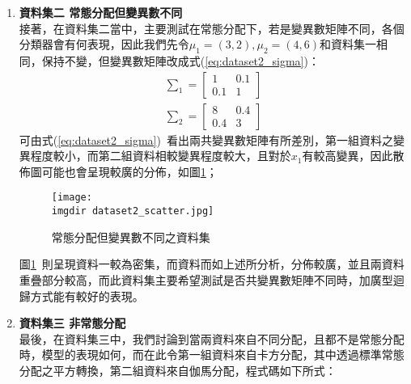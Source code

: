 \begin{enumerate}
	\item{\textbf{資料集二 常態分配但變異數不同}\\
接著，在資料集二當中，主要測試在常態分配下，若是變異數矩陣不同，各個分類器會有何表現，因此我們先令$\mu_1 = (3,2),\mu_2 =(4,6)$和資料集一相同，保持不變，但變異數矩陣改成式(\ref{eq:dataset2_sigma})：
	\begin{equation} 
	\begin{split}\label{eq:dataset2_sigma}
	\sum_{1} = \left[
            \begin{array}{cc}
                1 & 0.1 \\
                0.1 & 1    
            \end{array} \right]\\ 
     \sum_{2} = \left[
            \begin{array}{cc}
                8 & 0.4 \\
                0.4 & 3    
            \end{array} \right] 
    \end{split}  
    \end{equation}
	可由式(\ref{eq:dataset2_sigma})\ 看出兩共變異數矩陣有所差別，第一組資料之變異程度較小，而第二組資料相較變異程度較大，且對於$x_1$有較高變異，因此散佈圖可能也會呈現較廣的分佈，如圖\ref{fig:dataset2_scatter}；
\begin{figure}[H]	
		\centering	 			 	 
   		\texttt{[image: \\imgdir dataset2\_scatter.jpg]} 
   		\caption{常態分配但變異數不同之資料集}
   		\label{fig:dataset2_scatter}   			 		 
	\end{figure}	
	圖\ref{fig:dataset2_scatter}\ 則呈現資料一較為密集，而資料而如上述所分析，分佈較廣，並且兩資料重疊部分較高，而此資料集主要希望測試是否共變異數矩陣不同時，加廣型迴歸方式能有較好的表現。
	}
	
	\item{\textbf{資料集三 非常態分配}\\
	最後，在資料集三中，我們討論到當兩資料來自不同分配，且都不是常態分配時，模型的表現如何，而在此令第一組資料來自卡方分配，其中透過標準常態分配之平方轉換，第二組資料來自伽馬分配，程式碼如下所式：
	
}
\end{enumerate}
